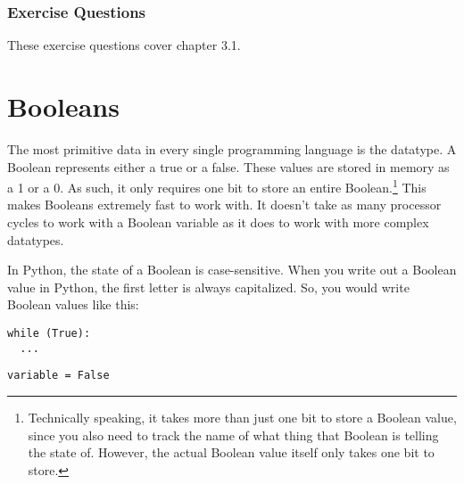 \subsubsection*{Exercise Questions}
These exercise questions cover chapter 3.1.
\begin{Exercise}
\end{Exercise}
\begin{Exercise}
\end{Exercise}
\section{Booleans}
The most primitive data in every single programming language is the  datatype. A Boolean represents either a true or a false. These values are stored in memory as a 1 or a 0. As such, it only requires one bit to store an entire Boolean.\footnote{Technically speaking, it takes more than just one bit to store a Boolean value, since you also need to track the name of what thing that Boolean is telling the state of. However, the actual Boolean value itself only takes one bit to store.} This makes Booleans extremely fast to work with. It doesn't take as many processor cycles to work with a Boolean variable as it does to work with more complex datatypes.\par
In Python, the state of a Boolean is case-sensitive. When you write out a Boolean value in Python, the first letter is always capitalized. So, you would write Boolean values like this:
\begin{lstlisting}[style=pippython]
while (True):
  ...
\end{lstlisting}
\begin{lstlisting}[style=pippython]
variable = False
\end{lstlisting}

